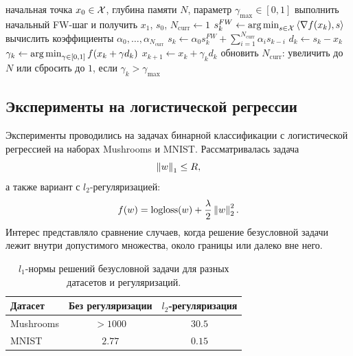 \begin{algorithm}
\caption{N-conjugate Frank--Wolfe для задачи машинного обучения}
\label{alg:nfw-ml}
\begin{algorithmic}
\REQUIRE начальная точка $x_0\in\mathcal{X}$, глубина памяти $N$, параметр $\gamma_{\max}\in[0,1]$
\STATE выполнить начальный FW-шаг и получить $x_1$, $s_0$, $N_{\mathrm{curr}}\gets 1$
\REPEAT
\STATE $s_k^{FW}\gets\operatorname*{arg\,min}_{s\in\mathcal{X}}\left\langle \nabla f(x_k), s \right\rangle$
\STATE вычислить коэффициенты $\alpha_0,\ldots,\alpha_{N_{\mathrm{curr}}}$
\STATE $s_k\gets\alpha_0s_k^{FW}+\sum_{i=1}^{N_{\mathrm{curr}}}\alpha_is_{k-i}$
\STATE $d_k\gets s_k-x_k$
\STATE $\gamma_k\gets\operatorname*{arg\,min}_{\gamma\in[0,1]}f(x_k+\gamma d_k)$
\STATE $x_{k+1}\gets x_k+\gamma_kd_k$
\STATE обновить $N_{\mathrm{curr}}$: увеличить до $N$ или сбросить до $1$, если $\gamma_k>\gamma_{\max}$
\end{algorithmic}
\end{algorithm}

\subsection{Эксперименты на логистической регрессии}

Эксперименты проводились на задачах бинарной классификации с логистической регрессией на наборах Mushrooms и MNIST.
Рассматривалась задача
\[
    \left\|w\right\|_1\leq R,
\]
а также вариант с $l_2$-регуляризацией:
\[
    f(w)=\operatorname{logloss}(w)+\frac{\lambda}{2}\left\|w\right\|_2^2.
\]
Интерес представляло сравнение случаев, когда решение безусловной задачи лежит внутри допустимого множества, около границы или далеко вне него.

\begin{table}[H]
\centering
\caption{$l_1$-нормы решений безусловной задачи для разных датасетов и регуляризаций.}
\begin{tabular}{lcc}
\toprule
Датасет & Без регуляризации & $l_2$-регуляризация \\
\midrule
Mushrooms & $>1000$ & $30.5$ \\
MNIST & $2.77$ & $0.15$ \\
\bottomrule
\end{tabular}
\label{tab:cfw-ml-l1-norms}
\end{table}

